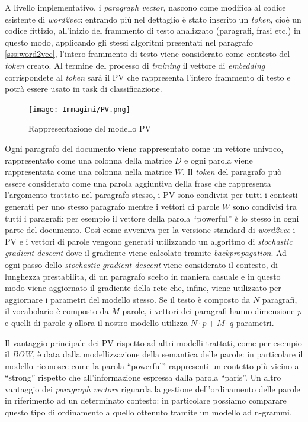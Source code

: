 \documentclass[a4paper,12pt,openright,twoside]{report}
\theoremstyle{definition}
\begin{document}
A livello implementativo, i \emph{paragraph vector}, nascono come modifica al codice esistente di \emph{word2vec}: entrando pi\`u nel dettaglio
è stato inserito un \emph{token}, cioè un codice fittizio,
all'inizio del frammento di testo analizzato (paragrafi, frasi etc.) in questo modo, 
applicando gli stessi algoritmi presentati nel paragrafo \ref{sss:word2vec}, 
l'intero frammento di testo viene considerato come contesto del \emph{token} creato.
Al termine del processo di \emph{training} il vettore di \emph{embedding} corrispondete
al \emph{token} sarà il PV che rappresenta l'intero frammento di testo e potrà
essere usato in task di classificazione.

\begin{figure}[ht]
  \centering
      \texttt{[image: Immagini/PV.png]}
      \caption{Rappresentazione del modello PV}
\label{fig:PV}
\end{figure}

Ogni paragrafo del documento viene rappresentato come un vettore univoco, rappresentato
come una colonna della matrice $D$ e ogni parola viene rappresentata come una
colonna nella matrice $W$.
Il \emph{token} del paragrafo può essere considerato come una parola aggiuntiva della frase
che rappresenta l'argomento trattato nel paragrafo stesso, i PV sono condivisi per tutti i 
contesti generati per uno stesso paragrafo mentre i vettori di parole $W$ sono condivisi
tra tutti i paragrafi: per esempio il vettore della parola ``powerful'' è lo stesso in ogni
parte del documento.
Cos\`i come avveniva per la versione standard di \emph{word2vec} i PV e i vettori di parole
vengono generati utilizzando un algoritmo di \emph{stochastic gradient descent} dove il gradiente
viene calcolato tramite \emph{backpropagation}.
Ad ogni passo dello \emph{stochastic gradient descent} viene considerato il contesto, di lunghezza prestabilita,
di un paragrafo scelto in maniera casuale e in questo modo viene aggiornato il gradiente della rete che, infine, viene
utilizzato per aggiornare i parametri del modello stesso.
Se il testo è composto da $N$ paragrafi, il vocabolario è composto da $M$ parole,
i vettori dei paragrafi hanno dimensione $p$ e quelli di parole $q$ allora il nostro modello
utilizza $N\cdot p + M\cdot q$ parametri.

Il vantaggio principale dei PV rispetto ad altri modelli trattati, come per esempio il \emph{BOW}, è 
data dalla modellizzazione della
semantica delle parole: in particolare il modello riconosce come la parola ``powerful'' 
rappresenti un contetto più vicino a ``strong'' rispetto
che all'informazione espressa dalla parola ``paris''.
Un altro vantaggio dei \emph{paragraph vectors} riguarda la gestione dell'ordinamento delle parole in riferimento
ad un determinato contesto: in particolare
possiamo comparare questo tipo di ordinamento a quello ottenuto tramite un modello ad n-grammi.
\end{document}
